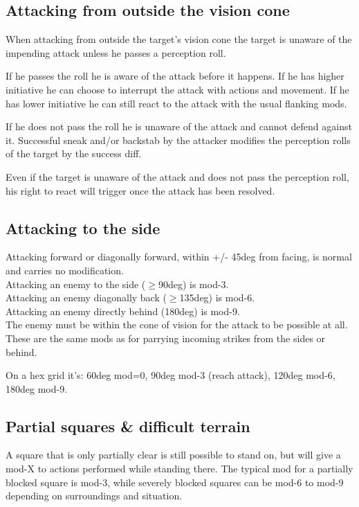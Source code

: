 \subsection*{Attacking from outside the vision cone}
When attacking from outside the target's vision cone the target is unaware of the impending attack unless he passes a perception roll.

If he passes the roll he is aware of the attack before it happens. If he has higher initiative he can choose to interrupt the attack with actions and movement. If he has lower initiative he can still react to the attack with the usual flanking mods.

If he does not pass the roll he is unaware of the attack and cannot defend against it. Successful sneak and/or backstab by the attacker modifies the perception rolls of the target by the success diff.

Even if the target is unaware of the attack and does not pass the perception roll, his right to react will trigger once the attack has been resolved.


\subsection*{Attacking to the side}
Attacking forward or diagonally forward, within +/- 45deg from facing, is normal and carries no modification. \\
Attacking an enemy to the side ($\ge$90deg) is mod-3. \\
Attacking an enemy diagonally back ($\ge$135deg) is mod-6. \\
Attacking an enemy directly behind (180deg) is mod-9. \\
The enemy must be within the cone of vision for the attack to be possible at all. \\
These are the same mods as for parrying incoming strikes from the sides or behind.

On a hex grid it's: 60deg mod=0, 90deg mod-3 (reach attack), 120deg mod-6, 180deg mod-9.


\subsection*{Partial squares \& difficult terrain}
A square that is only partially clear is still possible to stand on, but will give a mod-X to actions performed while standing there. The typical mod for a partially blocked square is mod-3, while severely blocked squares can be mod-6 to mod-9 depending on surroundings and situation.

